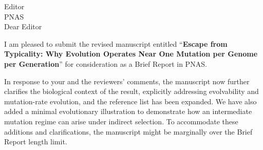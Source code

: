 \documentclass[9pt,onecolumn,compsoc]{IEEEtran}
\newcommand{\Space}{\vspace{10pt}}
\def\EDITOR{Editor}
\def\BEDITOR{Editor\xspace}
\def\JNAME{PNAS\xspace}
\def\JADDR{}
\def\TITLE{Escape from Typicality: Why Evolution Operates Near One Mutation per Genome per Generation}
\begin{document}
\parskip=12pt
\parindent=0pt
\Space
\Space
\fontsize{11}{12}\selectfont
\Space
\Space

 \EDITOR\\
 \JNAME\\
 \JADDR


 
Dear \BEDITOR  







I am pleased to submit the revised manuscript entitled ``\textbf{\TITLE}'' for consideration as a Brief Report in \JNAME.


In response to your and the reviewers’ comments, the manuscript now further clarifies the biological context of the result, explicitly addressing evolvability and mutation-rate evolution, and  the  reference list has been expanded. We have also added a minimal evolutionary illustration to demonstrate how an intermediate mutation regime can arise under indirect selection. To accommodate these additions and clarifications, the manuscript might be marginally over the Brief Report length limit.
\end{document}
